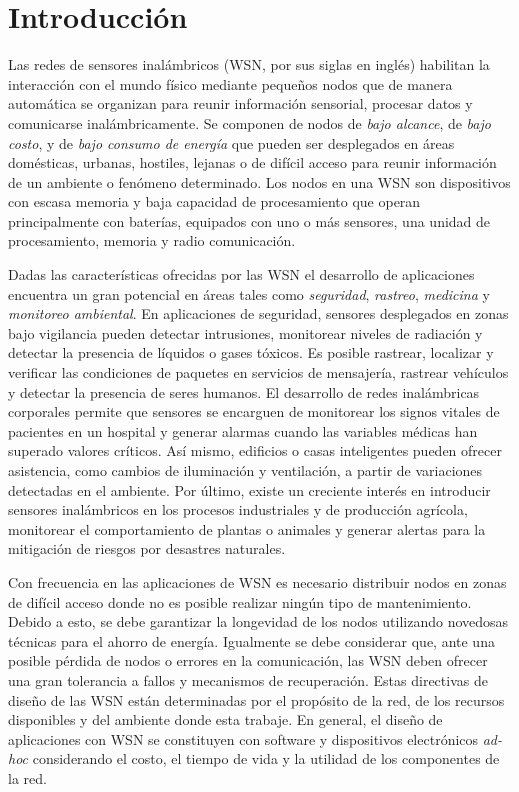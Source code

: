 \chapter{Introducción}
Las redes de sensores inalámbricos (WSN, por sus siglas en inglés) habilitan la interacción con el mundo físico mediante pequeños nodos que de manera automática se organizan para reunir información sensorial, procesar datos y comunicarse inalámbricamente\cite{ yick:wsn_survey}. Se componen de nodos de \textit{bajo alcance}, de \textit{bajo costo}, y de \textit{bajo consumo de energía} que pueden ser desplegados en áreas domésticas, urbanas, hostiles, lejanas o de difícil acceso para reunir información de un ambiente o fenómeno determinado. Los nodos en una WSN son dispositivos con escasa memoria y baja capacidad de procesamiento que operan principalmente con baterías, equipados con uno o más sensores, una unidad de procesamiento, memoria y radio comunicación.

Dadas las características ofrecidas por las WSN el desarrollo de aplicaciones encuentra un gran potencial en áreas tales como \textit{seguridad}, \textit{rastreo}, \textit{medicina} y \textit{monitoreo ambiental}. En aplicaciones de seguridad, sensores desplegados en zonas bajo vigilancia pueden detectar intrusiones, monitorear niveles de radiación y detectar la presencia de líquidos o gases tóxicos\cite{sun:bordersense, simon:sniper}. Es posible rastrear, localizar y verificar las condiciones de paquetes en servicios de mensajería, rastrear vehículos y detectar la presencia de seres humanos. El desarrollo de redes inalámbricas corporales permite que sensores se encarguen de monitorear los signos vitales de pacientes en un hospital y generar alarmas cuando las variables médicas han superado valores críticos\cite{ko:healthcare, redondi:laura}. Así mismo, edificios o casas inteligentes pueden ofrecer asistencia, como cambios de iluminación y ventilación, a partir de variaciones detectadas en el ambiente\cite{ spasova:wsn_aal}. Por último, existe un creciente interés en introducir sensores inalámbricos en los procesos industriales y de producción agrícola, monitorear el comportamiento de plantas o animales y generar alertas para la mitigación de riesgos por desastres naturales\cite{Zhao:wsn_industrial, anastasi:vinedo, corke:environmental, hart:esn}. 

Con frecuencia en las aplicaciones de WSN es necesario distribuir nodos en zonas de difícil acceso donde no es posible realizar ningún tipo de mantenimiento. Debido a esto, se debe garantizar la longevidad de los nodos utilizando novedosas técnicas para el ahorro de energía. Igualmente se debe considerar que, ante una posible pérdida de nodos o errores en la comunicación, las WSN deben ofrecer una gran tolerancia a fallos y mecanismos de recuperación. Estas directivas de diseño de las WSN están determinadas por el propósito de la red, de los recursos disponibles y del ambiente donde esta trabaje. En general, el diseño de aplicaciones con WSN se constituyen con software y dispositivos electrónicos \textit{ad-hoc} considerando el costo, el tiempo de vida y la utilidad de los componentes de la red. 

